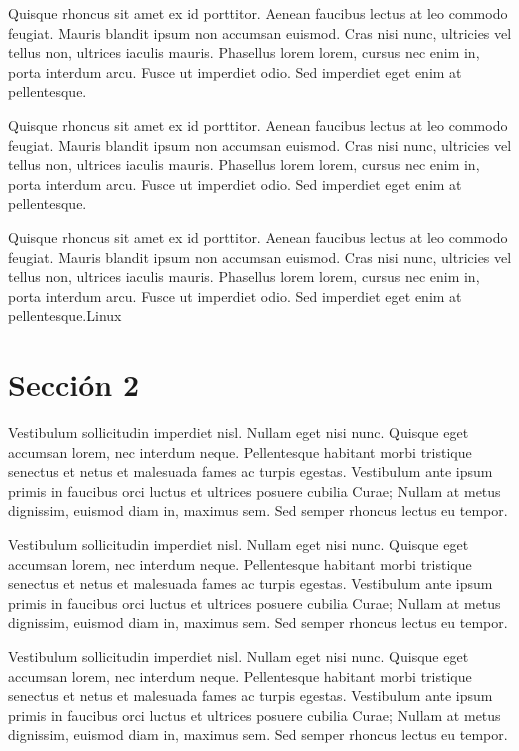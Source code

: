 	Quisque rhoncus sit amet ex id porttitor. Aenean faucibus lectus at leo commodo feugiat. Mauris blandit ipsum non accumsan euismod. Cras nisi nunc, ultricies vel tellus non, ultrices iaculis mauris. Phasellus lorem lorem, cursus nec enim in, porta interdum arcu. Fusce ut imperdiet odio. Sed imperdiet eget enim at pellentesque.
	
	Quisque rhoncus sit amet ex id porttitor. Aenean faucibus lectus at leo commodo feugiat. Mauris blandit ipsum non accumsan euismod. Cras nisi nunc, ultricies vel tellus non, ultrices iaculis mauris. Phasellus lorem lorem, cursus nec enim in, porta interdum arcu. Fusce ut imperdiet odio. Sed imperdiet eget enim at pellentesque.\cite{IEEEreferencias:Ref1}
	
	Quisque rhoncus sit amet ex id porttitor. Aenean faucibus lectus at leo commodo feugiat. Mauris blandit ipsum non accumsan euismod. Cras nisi nunc, ultricies vel tellus non, ultrices iaculis mauris. Phasellus lorem lorem, cursus nec enim in, porta interdum arcu. Fusce ut imperdiet odio. Sed imperdiet eget enim at pellentesque.\gls{Linux}
	
	
	
	\section{Sección 2}
	
	Vestibulum sollicitudin imperdiet nisl. Nullam eget nisi nunc. Quisque eget accumsan lorem, nec interdum neque. Pellentesque habitant morbi tristique senectus et netus et malesuada fames ac turpis egestas. Vestibulum ante ipsum primis in faucibus orci luctus et ultrices posuere cubilia Curae; Nullam at metus dignissim, euismod diam in, maximus sem. Sed semper rhoncus lectus eu tempor.
	
	Vestibulum sollicitudin imperdiet nisl. Nullam eget nisi nunc. Quisque eget accumsan lorem, nec interdum neque. Pellentesque habitant morbi tristique senectus et netus et malesuada fames ac turpis egestas. Vestibulum ante ipsum primis in faucibus orci luctus et ultrices posuere cubilia Curae; Nullam at metus dignissim, euismod diam in, maximus sem. Sed semper rhoncus lectus eu tempor.
	
	Vestibulum sollicitudin imperdiet nisl. Nullam eget nisi nunc. Quisque eget accumsan lorem, nec interdum neque. Pellentesque habitant morbi tristique senectus et netus et malesuada fames ac turpis egestas. Vestibulum ante ipsum primis in faucibus orci luctus et ultrices posuere cubilia Curae; Nullam at metus dignissim, euismod diam in, maximus sem. Sed semper rhoncus lectus eu tempor.
	
